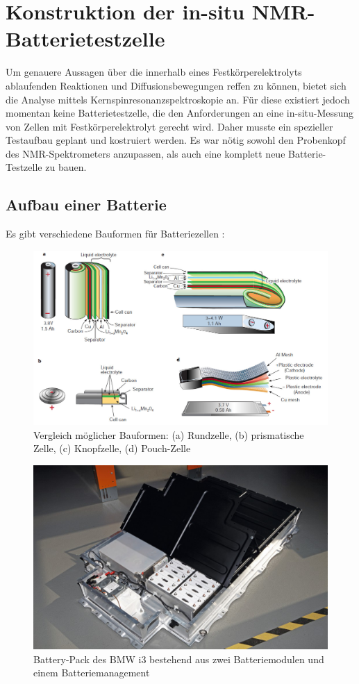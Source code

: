 \documentclass[a4paper, 11pt, headsepline,footsepline,twoside,abstract]{scrbook}
\begin{document}

\chapter{Konstruktion der in-situ NMR-Batterietestzelle}
Um genauere Aussagen über die innerhalb eines Festkörperelektrolyts ablaufenden Reaktionen und Diffusionsbewegungen reffen zu können, bietet sich die Analyse mittels Kernspinresonanzspektroskopie an. Für diese existiert jedoch momentan keine Batterietestzelle, die den Anforderungen an eine in-situ-Messung von Zellen mit Festkörperelektrolyt gerecht wird. Daher musste ein spezieller Testaufbau geplant und kostruiert werden. Es war nötig sowohl den Probenkopf des NMR-Spektrometers anzupassen, als auch eine komplett neue Batterie-Testzelle zu bauen.
\section{Aufbau einer Batterie}
Es gibt verschiedene Bauformen für Batteriezellen \cite{tarascon2001issues}:
\begin{figure}
	\centering
	\includegraphics[width=1.0\columnwidth]{images/uebersicht_bauformen.jpg}
	\caption{Vergleich möglicher Bauformen: (a) Rundzelle, (b) prismatische Zelle, (c) Knopfzelle, (d) Pouch-Zelle \cite{tarascon2001issues}}
	\label{vergleich_zellform}
\end{figure}
\begin{figure}
	\centering
	\includegraphics[width=0.9\columnwidth]{images/bmw-i3-battery-pack.png}
	\caption{Battery-Pack des BMW i3 bestehend aus zwei Batteriemodulen und einem Batteriemanagement \cite{bmwblog}}
	\label{battery_pack}
\end{figure}
\end{document}
